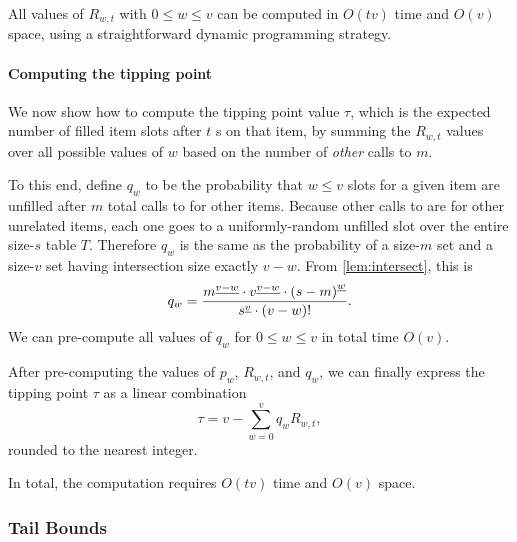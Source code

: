 All values of $R_{w,t}$ with $0\le w \le v$ can be computed in $O(tv)$ time and $O(v)$ space,
using a straightforward dynamic programming strategy.

\paragraph{Computing the tipping point}

We now show how to compute the tipping point value $\tau$, which is the expected number of filled item slots
after $t$ \Increment{}s on that item, by summing the $R_{w,t}$ values over all possible
values of $w$ based on the number of \emph{other} calls to \Increment{} $m$.

To this end, define $q_w$ to be the probability that $w\le v$ slots for a given item are unfilled
after $m$ total calls to \Increment{} for other items. Because other calls to \Increment{} are for other
unrelated items, each one goes to a uniformly-random unfilled slot over the entire size-$s$ table $T$.
Therefore $q_w$ is the same as the probability of a size-$m$ set and a size-$v$ set having intersection size exactly $v-w$. From \cref{lem:intersect}, this is
\[q_w = 
    \frac{{m}^{\underline{v-w}} \cdot{} {v}^{\underline{v-w}} \cdot{} {(s-m)}^{\underline{w}}}
         {{s}^{\underline{v}} \cdot{} (v-w)!}.
\]
We can pre-compute all values of $q_w$ for $0\le w\le v$ in total time $O(v)$.

After pre-computing the values of $p_w$, $R_{w,t}$, and $q_w$, we can finally express
the tipping point $\tau$ as a linear combination
\begin{equation}\label{eqn:r}
    \tau = v - \sum_{w=0}^v q_w R_{w,t},
\end{equation}
rounded to the nearest integer.

In total, the computation requires $O(tv)$ time and $O(v)$ space.

\subsubsection{Tail Bounds}\label{sec:tailbounds}

\newcommand{\CminvOverk}{7.042652}
\newcommand{\CminukOvers}{0.5184846}
\newcommand{\Cplow}{0.956414}
\newcommand{\CmaxvOvers}{0.00386}
\newcommand{\CmaxuvOvers}{3.65151}
\newcommand{\Cphigh}{0.974876}
\newcommand{\CzeroUpper}{3.66567}
\newcommand{\CvLower}{371}
\newcommand{\CboxUpper}{0.00989}
\newcommand{\CminsOvern}{96}
\newcommand{\CmaxvOvert}{7.409}
\newcommand{\CmaxvOvertb}{8}
\newcommand{\Cfour}{1.0520553}
\newcommand{\Cminfp}{2.1}

